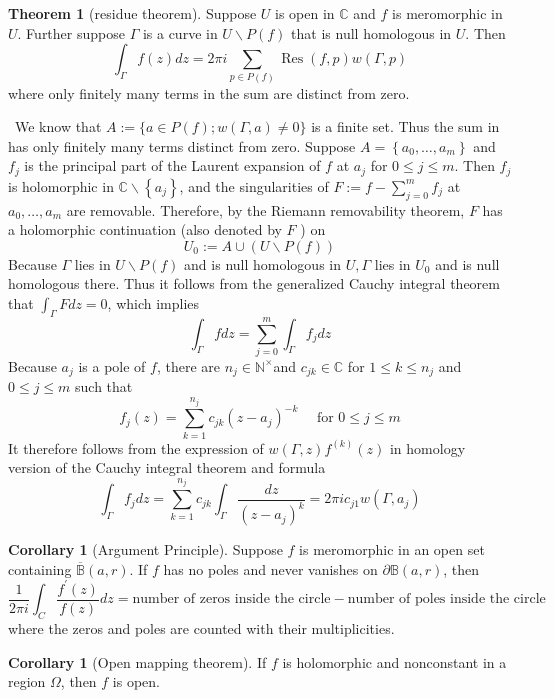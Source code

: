 \documentclass[12pt,a4paper]{book}
\newenvironment{prooff}{{\noindent\it\textcolor{cyan!40!black}{Proof}:}\,}{\par}
\newcommand{\bb}[1]{\mathbb{#1}}
\newcommand{\p}{^{\prime}}
\theoremstyle{definition}
\newtheorem{coro}[defn]{Corollary}
\newtheorem{theo}[defn]{Theorem}
\begin{document}
\begin{theo}[residue theorem]
    Suppose $U$ is open in $\mathbb{C}$ and $f$ is meromorphic in $U$. Further suppose $\Gamma$ is a curve in $U \backslash P(f)$ that is null homologous in $U$. Then
    $$
    \int_{\Gamma} f(z) d z=2 \pi i \sum_{p \in P(f)} \operatorname{Res}(f, p) w(\Gamma, p)
    $$
    where only finitely many terms in the sum are distinct from zero.
\end{theo}
\begin{prooff}
    We know that $A:=\{a \in P(f) ; w(\Gamma, a) \neq 0\}$ is a finite set. Thus the sum in has only finitely many terms distinct from zero.
    Suppose $A=\left\{a_0, \ldots, a_m\right\}$ and $f_j$ is the principal part of the Laurent expansion of $f$ at $a_j$ for $0 \leq j \leq m$. Then $f_j$ is holomorphic in $\mathbb{C} \backslash\left\{a_j\right\}$, and the singularities of $F:=f-\sum_{j=0}^m f_j$ at $a_0, \ldots, a_m$ are removable.
    Therefore, by the Riemann removability theorem, $F$ has a holomorphic continuation (also denoted by $F$ ) on
    $$
    U_0:=A \cup(U \backslash P(f))
    $$
    Because $\Gamma$ lies in $U \backslash P(f)$ and is null homologous in $U, \Gamma$ lies in $U_0$ and is null homologous there. Thus it follows from the generalized Cauchy integral theorem that $\int_{\Gamma} F d z=0$, which implies
    $$
    \int_{\Gamma} f d z=\sum_{j=0}^m \int_{\Gamma} f_j d z
    $$
    Because $a_j$ is a pole of $f$, there are $n_j \in \mathbb{N}^{\times}$and $c_{j k} \in \mathbb{C}$ for $1 \leq k \leq n_j$ and $0 \leq j \leq m$ such that
$$
f_j(z)=\sum_{k=1}^{n_j} c_{j k}\left(z-a_j\right)^{-k} \quad \text { for } 0 \leq j \leq m
$$
It therefore follows from the expression of $w(\Gamma, z) f^{(k)}(z)$ in homology version of the Cauchy integral theorem and formula
$$
\int_{\Gamma} f_j d z=\sum_{k=1}^{n_j} c_{j k} \int_{\Gamma} \frac{d z}{\left(z-a_j\right)^k}=2 \pi i c_{j 1} w\left(\Gamma, a_j\right)
$$
    
\end{prooff}
\begin{coro}[Argument Principle]
Suppose $f$ is meromorphic in an open set containing $\overline{\bb{B}}(a,r)$. 
If $f$ has no poles and never vanishes on $\partial\bb{B}(a,r)$, 
then
$$
\frac{1}{2\pi i}\int_C \frac{f\p(z)}{f(z)} dz=\text{number of zeros inside the circle}-\text{number of poles inside the circle}   
$$
where the zeros and poles are counted with their multiplicities.
\end{coro}
\begin{coro}[Open mapping theorem]
    If $f$ is holomorphic and nonconstant in a region $\Omega$, then $f$ is open.
\end{coro}
\end{document}
